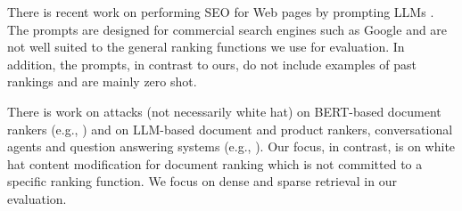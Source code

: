There is recent work on performing SEO for Web pages by prompting LLMs
\cite{Aggarwal+al:24a}. The prompts are designed for commercial search
engines such as Google and are not well suited to the
general ranking functions we use for evaluation. In addition, the
prompts, in contrast to ours, do not include examples of past rankings
and are mainly zero shot.
  
There is work on attacks (not necessarily white hat) on
BERT-based document rankers (e.g., \cite{Wu+al:23a}) and on LLM-based document and product rankers, conversational agents and question answering systems
(e.g., \cite{Kumar+Lakkaraju:24a,Pfrommer+al:24a,Nestaas+al:24a}). Our focus, in contrast, is on white hat content modification for document ranking which is not committed to a specific ranking function. We focus on dense and sparse retrieval in our evaluation.

